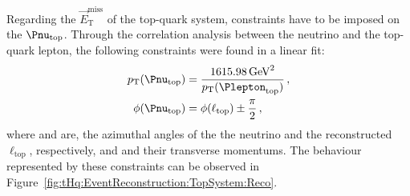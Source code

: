 \begin{comment}
\begin{figure}[h] 
	\begin{subfigure}{0.45\textwidth}
	\texttt{[image: Chapter5\_tHq/Reconstruction/Pzv\_vs\_Pzl\_truth\_alp05]}
	\caption{Truth $p_{z}(\ell_{\text{top}})$ vs. Truth $p_{z}(\nu)$}
	\label{fig:tHq:EventReconstruction:TopSystem:hypothesis1:A}
	\end{subfigure}
\hfill 
	\begin{subfigure}{0.45\textwidth}
	\texttt{[image: Chapter5\_tHq/Reconstruction/Pzv\_vs\_Pzl\_Reco\_alp05]}
	\caption{Reco. $p_{z}(\elll_{\text{top}})$ vs. Reco. \pnutopz}
	\label{fig:tHq:EventReconstruction:TopSystem:hypothesis1:B	}
	\end{subfigure}

\bigskip  
	\begin{subfigure}{0.45\textwidth}
	\texttt{[image: Chapter5\_tHq/Reconstruction/truth\_vs\_reco\_pz\_l\_alp05]}
	\caption{Reco. $p_{z}(\elll_{\text{top}})$ vs. Truth $p_{z}(\ell)$}
	\label{fig:tHq:EventReconstruction:TopSystem:hypothesis1:C}
	\end{subfigure}
\hfill 
	\begin{subfigure}{0.45\textwidth}
	\texttt{[image: Chapter5\_tHq/Reconstruction/truth\_vs\_reco\_pz\_nu\_alp05]}
	\caption{Reconstructed \pnutopz vs Truth \pnutopz}
	\label{fig:tHq:EventReconstruction:TopSystem:hypothesis1:D}
	\end{subfigure}

\caption{Distributions comparing \pnutopz and $p_{z}(\ell_{\text{top}})$
at truth and reconstruction levels for \tHq \dileptau events.} %
\label{fig:tHq:EventReconstruction:TopSystem:hypothesis1}
\end{figure}
\end{comment}


Regarding the $\overrightarrow{E}_{\text{T}}^{\text{miss}}$ of the top-quark system, 
constraints have to be 
imposed on the $\Pnu_{\text{top}}$. Through the correlation analysis between the neutrino and 
the top-quark lepton, the following constraints were found in a linear fit:
\begin{align*}
    \pnutopT & =\frac{1615.98\, \text{GeV}^2}{\pltopT}\,,\\
    \phinutop &= \philtop\pm\frac{\pi}{2}\, ,
\end{align*}
where \phinutop and \philtop are, the azimuthal angles of the 
the neutrino and the reconstructed $\ell_{\text{top}}$, respectively, and 
\pnutopT and \pltopT their transverse momentums. The behaviour represented
by these constraints can be observed in Figure~\ref{fig:tHq:EventReconstruction:TopSystem:Reco}.

